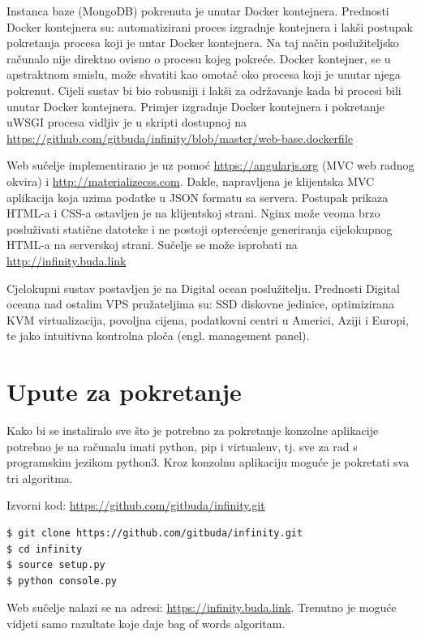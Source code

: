 \documentclass[a4paper,12pt]{article}
\begin{document}
\vspace{0.3cm}

Instanca baze (MongoDB) pokrenuta je unutar Docker kontejnera. Prednosti Docker kontejnera su: automatizirani proces izgradnje kontejnera i lakši postupak pokretanja procesa koji je untar Docker kontejnera. Na taj način poslužiteljsko računalo nije direktno ovisno o procesu kojeg pokreće. Docker kontejner, se  u apstraktnom smislu, može shvatiti kao omotač oko procesa koji je unutar njega pokrenut. Cijeli sustav bi bio robusniji i lakši za održavanje kada bi procesi bili unutar Docker kontejnera. Primjer izgradnje Docker kontejnera i pokretanje uWSGI procesa vidljiv je u skripti dostupnoj na \url{https://github.com/gitbuda/infinity/blob/master/web-base.dockerfile}

Web sučelje implementirano je uz pomoć \url{https://angularjs.org} (MVC web radnog okvira) i \url{http://materializecss.com}. Dakle, napravljena je klijentska MVC aplikacija koja uzima podatke u JSON formatu sa servera. Postupak prikaza HTML-a i CSS-a ostavljen je na klijentskoj strani. Nginx može veoma brzo posluživati statične datoteke i ne postoji opterećenje generiranja cijelokupnog HTML-a na serverskoj strani. Sučelje se može isprobati na \url{http://infinity.buda.link}

Cjelokupni sustav postavljen je na Digital ocean poslužitelju. Prednosti Digital oceana nad ostalim VPS pružateljima su: SSD diskovne jedinice, optimizirana KVM virtualizacija, povoljna cijena, podatkovni centri u Americi, Aziji i Europi, te jako intuitivna kontrolna ploča (engl. management panel).

\section{Upute za pokretanje}

Kako bi se instaliralo sve što je potrebno za pokretanje konzolne aplikacije potrebno je na računalu imati python, pip i virtualenv, tj. sve za rad s programskim jezikom python3. Kroz konzolnu aplikaciju moguće je pokretati sva tri algoritma.

Izvorni kod: \url{https://github.com/gitbuda/infinity.git}

\begin{lstlisting}[language=bash]
$ git clone https://github.com/gitbuda/infinity.git
$ cd infinity
$ source setup.py
$ python console.py
\end{lstlisting}

Web sučelje nalazi se na adresi: \url{https://infinity.buda.link}. Trenutno je moguće vidjeti samo razultate koje daje bag of words algoritam.
\end{document}
